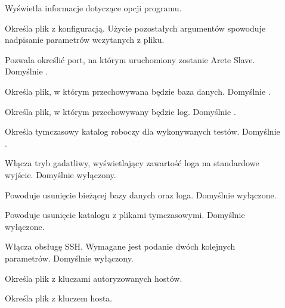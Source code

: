 \documentclass[00-praca-magisterska.tex]{subfiles}
\begin{document}
\begin{description}
\item[]

Wyświetla informacje dotyczące opcji programu.

\item[]

Określa plik z konfiguracją. Użycie pozostałych argumentów spowoduje nadpisanie
parametrów wczytanych z pliku.

\item[]

Pozwala określić port, na którym uruchomiony zostanie Arete Slave. Domyślnie
.

\item[]

Określa plik, w którym przechowywana będzie baza danych. Domyślnie .

\item[]

Określa plik, w którym przechowywany będzie log. Domyślnie .

\item[]

Określa tymczasowy katalog roboczy dla wykonywanych testów. Domyślnie
.

\item[]

Włącza tryb gadatliwy, wyświetlający zawartość loga na standardowe wyjście.
Domyślnie wyłączony.

\item[]

Powoduje usunięcie bieżącej bazy danych oraz loga. Domyślnie wyłączone.

\item[]

Powoduje usunięcie katalogu z plikami tymczasowymi. Domyślnie wyłączone.

\item[]

Włącza obsługę SSH. Wymagane jest podanie dwóch kolejnych parametrów. Domyślnie
wyłączony.

\item[]

Określa plik z kluczami autoryzowanych hostów.

\item[]

Określa plik z kluczem hosta.

\end{description}
\end{document}

